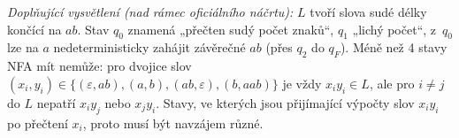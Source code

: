 \medskip
\noindent\textit{Doplňující vysvětlení (nad rámec oficiálního náčrtu):} $L$ tvoří
slova sudé délky končící na $ab$. Stav $q_0$ znamená „přečten sudý počet znaků``,
$q_1$ „lichý počet``, z~$q_0$ lze na $a$ nedeterministicky zahájit závěrečné $ab$
(přes $q_2$ do $q_F$). Méně než 4 stavy NFA mít nemůže: pro dvojice slov
$(x_i, y_i) \in \{(\varepsilon, ab), (a, b), (ab, \varepsilon), (b, aab)\}$ je vždy
$x_i y_i \in L$, ale pro $i \neq j$ do $L$ nepatří $x_i y_j$ nebo $x_j y_i$. Stavy, ve
kterých jsou přijímající výpočty slov $x_i y_i$ po přečtení $x_i$, proto musí být
navzájem různé.
